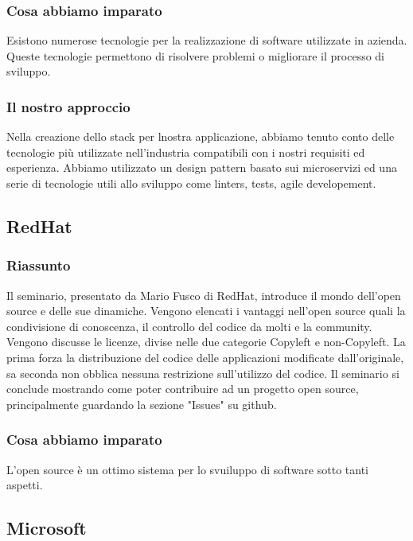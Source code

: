\documentclass{report}
\begin{document}
\subsubsection*{Cosa abbiamo imparato}

Esistono numerose tecnologie per la realizzazione di software utilizzate in azienda. Queste tecnologie permettono di risolvere problemi o migliorare il processo di sviluppo. 

\subsubsection*{Il nostro approccio}

Nella creazione dello stack per lnostra applicazione, abbiamo tenuto conto delle tecnologie più utilizzate nell'industria compatibili con i nostri requisiti ed esperienza. Abbiamo utilizzato un design pattern basato sui microservizi ed una serie di tecnologie utili allo sviluppo come linters, tests, agile developement.

\subsection{RedHat}

\subsubsection*{Riassunto}
Il seminario, presentato da Mario Fusco di RedHat, introduce il mondo dell'open source e delle sue dinamiche. Vengono elencati i vantaggi nell'open source quali la condivisione di conoscenza, il controllo del codice da molti e la community. Vengono discusse le licenze, divise nelle due categorie Copyleft e non-Copyleft. La prima forza la distribuzione del codice delle applicazioni modificate dall'originale, sa seconda non obblica nessuna restrizione sull'utilizzo del codice. Il seminario si conclude mostrando come poter contribuire ad un progetto open source, principalmente guardando la sezione "Issues" su github.
\subsubsection*{Cosa abbiamo imparato}
L'open source è un ottimo sistema per lo svuiluppo di software sotto tanti aspetti.


\subsection{Microsoft}
\end{document}
